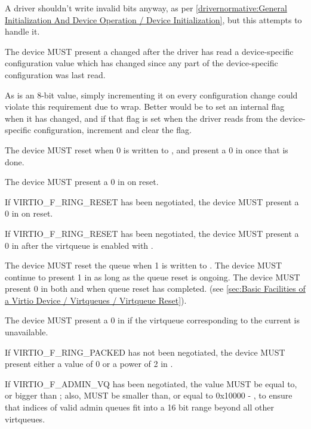 \begin{note}
  A driver shouldn't write invalid bits anyway, as per \ref{drivernormative:General Initialization And Device Operation / Device Initialization}, but this attempts to handle it.
\end{note}

The device MUST present a changed  after the
driver has read a device-specific configuration value which has
changed since any part of the device-specific configuration was last
read.
\begin{note}
As  is an 8-bit value, simply incrementing it
on every configuration change could violate this requirement due to wrap.
Better would be to set an internal flag when it has changed,
and if that flag is set when the driver reads from the device-specific
configuration, increment  and clear the flag.
\end{note}

The device MUST reset when 0 is written to , and
present a 0 in  once that is done.

The device MUST present a 0 in  on reset.

If VIRTIO_F_RING_RESET has been negotiated, the device MUST present a 0 in
 on reset.

If VIRTIO_F_RING_RESET has been negotiated, the device MUST present a 0 in
 after the virtqueue is enabled with .

The device MUST reset the queue when 1 is written to . The
device MUST continue to present 1 in  as long as the queue reset
is ongoing. The device MUST present 0 in both  and 
when queue reset has completed.
(see \ref{sec:Basic Facilities of a Virtio Device / Virtqueues / Virtqueue Reset}).

The device MUST present a 0 in  if the virtqueue
corresponding to the current  is unavailable.

If VIRTIO_F_RING_PACKED has not been negotiated, the device MUST
present either a value of 0 or a power of 2 in
.

If VIRTIO_F_ADMIN_VQ has been negotiated, the value
 MUST be equal to, or bigger than
; also,  MUST be
smaller than, or equal to 0x10000 - ,
to ensure that indices of valid admin queues fit into
a 16 bit range beyond all other virtqueues.

